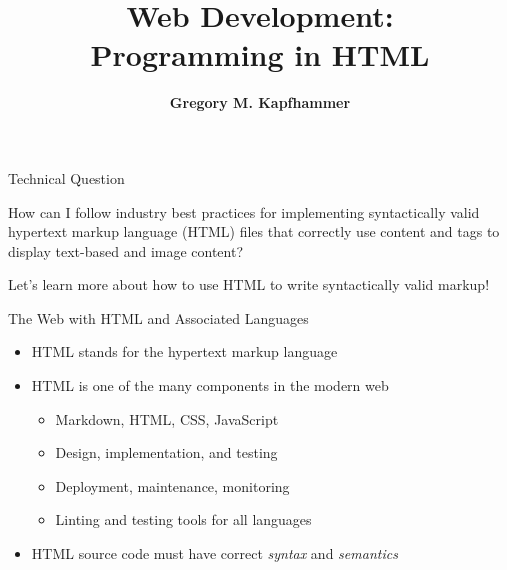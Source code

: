 \documentclass[14pt,aspectratio=169]{beamer}
\title{Web Development: \\ Programming in HTML}
\author{{\bf Gregory M. Kapfhammer}}
\institute[shortinst]{{\bf Department of Computer Science, Allegheny College}}
\begin{document}
{
  \begin{frame}
    \titlepage
  \end{frame}
}

%
\begin{frame}{Technical Question}
  \hspace*{.25in}
  \vspace*{.2in}
  \begin{center}
    {\large How can I follow industry best practices for implementing
      syntactically valid hypertext markup language (HTML) files that correctly
    use content and tags to display text-based and image content?}
  \end{center}
  \vspace{1ex}
  \begin{center}
    \small Let's learn more about how to use HTML to write syntactically valid markup!
  \end{center}
\end{frame}

%
\begin{frame}{The Web with HTML and Associated Languages}
%
  \begin{itemize}
    \item HTML stands for the hypertext markup language
    \item HTML is one of the many components in the modern web
      \begin{itemize}
        \item Markdown, HTML, CSS, JavaScript
        \item Design, implementation, and testing
        \item Deployment, maintenance, monitoring
        \item Linting and testing tools for all languages
      \end{itemize}
    \item HTML source code must have correct {\em syntax} and {\em semantics}
  \end{itemize}
%
\end{frame}
\end{document}
